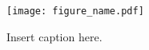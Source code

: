 













\begin{figure}
\centering
\texttt{[image: figure\_name.pdf]}
\caption{Insert caption here.}
\label{figure_label}
\end{figure}
